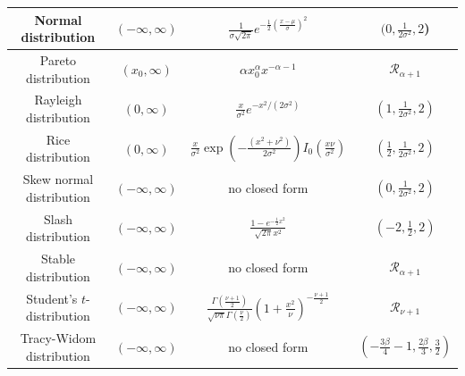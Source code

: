 \documentclass[../thesis.tex]{subfiles}
\begin{document}
{\begin{longtable}{|c|c|c|c|}
      \hline
      Normal distribution                                                   & $(-\infty,\infty)$                                      & $\frac{1}{\sigma\sqrt{2\pi}}e^{-\frac{1}{2}(\frac{x-\mu}{\sigma})^{2}}$                                                         & $(0,\frac{1}{2\sigma^{2}},2$)\tabularnewline
      \hline
      Pareto distribution                                                   & $(x_{0},\infty)$                                        & $\alpha x_{0}^{\alpha}x^{-\alpha-1}$                                                                                            & $\mathcal{R}_{\alpha+1}$\tabularnewline
      \hline
      Rayleigh distribution                                                 & $(0,\infty)$                                            & $\frac{x}{\sigma^{2}}e^{-x^{2}/(2\sigma^{2})}$                                                                                  & $(1,\frac{1}{2\sigma^{2}},2)$\tabularnewline
      \hline
      Rice distribution                                                     & $(0,\infty)$                                            & $\frac{x}{\sigma^{2}}\exp\left(-\frac{(x^{2}+\nu^{2})}{2\sigma^{2}}\right)I_{0}\left(\frac{x\nu}{\sigma^{2}}\right)$            & $(\frac{1}{2},\frac{1}{2\sigma^{2}},2)$\tabularnewline
      \hline
      Skew normal distribution                                              & $(-\infty,\infty)$                                      & no closed form                                                                                                                  & $(0,\frac{1}{2\sigma^{2}},2)$\tabularnewline
      \hline
      Slash distribution                                                    & $(-\infty,\infty)$                                      & $\frac{1-e^{-\frac{1}{2}x^{2}}}{\sqrt{2\pi}x^{2}}$                                                                              & $(-2,\frac{1}{2},2)$\tabularnewline
      \hline
      Stable distribution                                                   & $(-\infty,\infty)$                                      & no closed form                                                                                                                  & $\mathcal{R}_{\alpha+1}$\tabularnewline
      \hline
      Student's $t$-distribution                                            & $(-\infty,\infty)$                                      & $\frac{\Gamma(\frac{\nu+1}{2})}{\sqrt{\nu\pi}\Gamma(\frac{\nu}{2})}\left(1+\frac{x^{2}}{\nu}\right)^{-\frac{\nu+1}{2}}$         & $\mathcal{R}_{\nu+1}$\tabularnewline
      \hline
      Tracy-Widom distribution                                              & $(-\infty,\infty)$                                      & no closed form                                                                                                                  & $(-\frac{3\beta}{4}-1,\frac{2\beta}{3},\frac{3}{2})$\tabularnewline

\end{longtable}}
\end{document}
